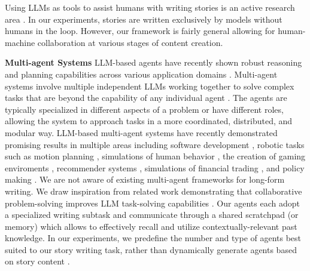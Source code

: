 \documentclass{article}
\begin{document}
Using LLMs as tools to assist humans with writing stories is an active
research area
\citep{chakrabarty:ea:2024b,piotr:ea:2023,ippolito2022creativewritingaipoweredwriting}. In
our experiments, stories are written exclusively by models without
humans in the loop.  However, our framework is fairly general allowing
for human-machine collaboration at various stages of content creation.

\textbf{Multi-agent Systems}
LLM-based agents have recently shown robust reasoning and planning
capabilities across various application domains
\citep{zhao2023surveylargelanguagemodels,bubeck2023sparksartificialgeneralintelligence}. Multi-agent
systems involve multiple independent LLMs working together to solve
complex tasks that are beyond the capability of any individual agent
\citep{talebirad2023multiagentcollaborationharnessingpower,park:ea:2023,han2024llmmultiagentsystemschallenges,ijcai2024p890}.
The agents are typically specialized in different aspects of a problem
or have different roles, allowing the system to approach tasks in a more coordinated, distributed, and modular way.  LLM-based multi-agent
systems have recently demonstrated promising results in multiple areas
including software development \citep{hong2024metagpt}, robotic tasks
such as motion planning \citep{mandi:ea:2024}, simulations of human
behavior \citep{park:ea:2023,hua2024warpeacewaragentlarge}, the
creation of gaming enviroments \citep{hu2024survey}, recommender
systems \citep{zhang:ea:2024},  simulations of financial trading
\citep{RePEc:arx:papers:2309.03736}, and policy making 
\citep{xiao2023simulatingpublicadministrationcrisis}.  We are not
aware of existing multi-agent frameworks for long-form writing. We
draw inspiration from related work demonstrating that collaborative
problem-solving improves LLM task-solving capabilities
\citep{hao2023chatllmnetworkbrainsintelligence,wang-etal-2024-unleashing,zhang-etal-2024-exploring}. Our
agents each adopt a specialized writing subtask and communicate
through a shared scratchpad (or memory) which allows to effectively
recall and utilize contextually-relevant past knowledge. In our
experiments, we predefine the number and type of agents best suited to
our story writing task, rather than dynamically generate agents
based on story content \citep{ijcai2024p3}.
\end{document}
